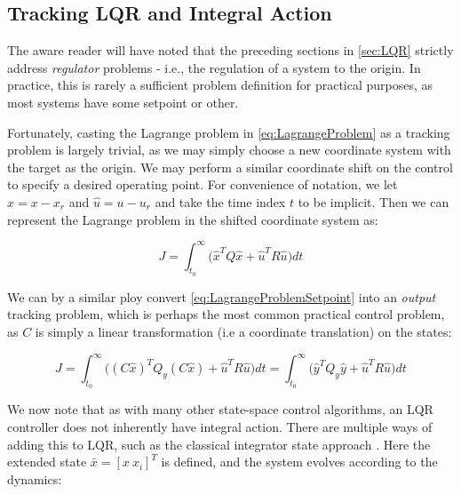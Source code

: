 \subsection{Tracking LQR and Integral Action}\label{subsec:TrackingAndIntegralAction}

The aware reader will have noted that the preceding sections in \cref{sec:LQR} strictly address \textit{regulator} problems - i.e., the regulation of a system to the origin. In practice, this is rarely a sufficient problem definition for practical purposes, as most systems have some setpoint or other. 

Fortunately, casting the Lagrange problem in \cref{eq:LagrangeProblem} as a tracking problem is largely trivial, as we may simply choose a new coordinate system with the target as the origin. We may perform a similar coordinate shift on the control to specify a desired operating point. For convenience of notation, we let $\hat{x} = x-x_r$ and $\hat{u} = u-u_r$ and take the time index $t$ to be implicit. Then we can represent the Lagrange problem in the shifted coordinate system as:

\begin{equation}\label{eq:LagrangeProblemSetpoint}
	J = \int_{t_0}^{\infty} \big(\hat{x}^TQ\hat{x} + \hat{u}^TR\hat{u}\big)dt
\end{equation} 

We can by a similar ploy convert \cref{eq:LagrangeProblemSetpoint} into an \textit{output} tracking problem, which is perhaps the most common practical control problem, as $C$ is simply a linear transformation (i.e a coordinate translation) on the states:

\begin{equation}\label{eq:LagrangeProblemOutput}
	J = \int_{t_0}^{\infty} \big((C\hat{x})^TQ_y(C\hat{x}) + \hat{u}^TR\hat{u}\big)dt = \int_{t_0}^{\infty} \big(\hat{y}^TQ_y\hat{y} + \hat{u}^TR\hat{u}\big)dt
\end{equation} 

We now note that as with many other state-space control algorithms, an LQR controller does not inherently have integral action. There are multiple ways of adding this to LQR, such as the classical integrator state approach \cite{Skogestad2005}. Here the extended state $\bar{x} = [x \ x_i]^T$ is defined, and the system evolves according to the dynamics:

